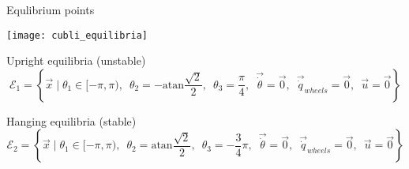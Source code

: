 \begin{frame}[shrink = 30]{Equlibrium points}
  \begin{center}
    \texttt{[image: cubli\_equilibria]}
  \end{center}
  \begin{block}{Upright equilibria (unstable)}
  \[
  \mathcal{E}_{1} = \left\{ \vec{x} \mid \theta_1 \in [-\pi, \pi),\enspace \theta_2 = -\mathrm{atan}\frac{\sqrt{2}}{2},\enspace
   \theta_3 = \frac{\pi}{4},\enspace
    \vec{\dot{\theta}} = \vec{0},\enspace
    \vec{\dot{q}}_{wheels} = \vec{0},\enspace
    \vec{u} = \vec{0}
    \right\}
   \]
  \end{block}
  \begin{block}{Hanging equilibria (stable)}
    \[
    \mathcal{E}_{2} = \left\{
    \vec{x} \mid \theta_1 \in [-\pi, \pi),\enspace
      \theta_2 = \mathrm{atan}\frac{\sqrt{2}}{2},\enspace
    \theta_3 = -\frac{3}{4} \pi,\enspace
    \vec{\dot{\theta}} = \vec{0},\enspace
    \vec{\dot{q}}_{wheels} = \vec{0},\enspace
    \vec{u} = \vec{0}
    \right\}
    \]
  \end{block}
\end{frame}
